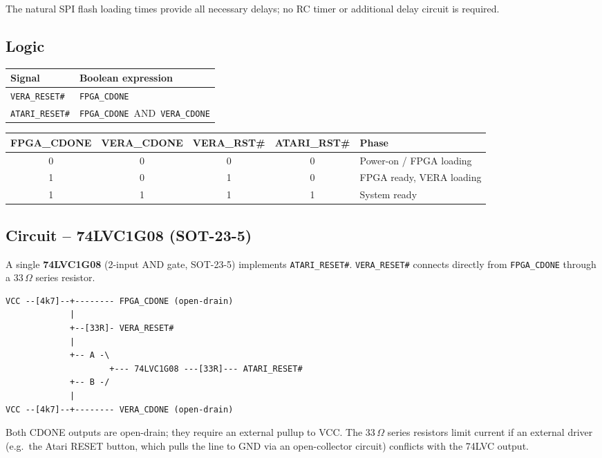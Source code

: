 \documentclass[11pt,a4paper]{article}
\newcommand{\sig}[1]{\texttt{#1}}
\begin{document}
The natural SPI flash loading times provide all necessary delays; no RC
timer or additional delay circuit is required.

\subsection{Logic}

\begin{center}
\begin{tabular}{ll}
\toprule
\textbf{Signal} & \textbf{Boolean expression} \\
\midrule
\sig{VERA\_RESET\#}  & \sig{FPGA\_CDONE} \\
\sig{ATARI\_RESET\#} & \sig{FPGA\_CDONE}~AND~\sig{VERA\_CDONE} \\
\bottomrule
\end{tabular}
\end{center}

\begin{center}
\begin{tabular}{ccccp{3.5cm}}
\toprule
\textbf{FPGA\_CDONE} & \textbf{VERA\_CDONE} &
\textbf{VERA\_RST\#} & \textbf{ATARI\_RST\#} & \textbf{Phase} \\
\midrule
0 & 0 & 0 & 0 & Power-on / FPGA loading \\
1 & 0 & 1 & 0 & FPGA ready, VERA loading \\
1 & 1 & 1 & 1 & System ready \\
\bottomrule
\end{tabular}
\end{center}

\subsection{Circuit -- 74LVC1G08 (SOT-23-5)}

A single \textbf{74LVC1G08} (2-input AND gate, SOT-23-5) implements
\sig{ATARI\_RESET\#}.  \sig{VERA\_RESET\#} connects directly from
\sig{FPGA\_CDONE} through a 33\,$\Omega$ series resistor.

\begin{lstlisting}[style=shell]
VCC --[4k7]--+-------- FPGA_CDONE (open-drain)
             |
             +--[33R]- VERA_RESET#
             |
             +-- A -\
                     +--- 74LVC1G08 ---[33R]--- ATARI_RESET#
             +-- B -/
             |
VCC --[4k7]--+-------- VERA_CDONE (open-drain)
\end{lstlisting}

Both CDONE outputs are open-drain; they require an external pullup to
VCC\@.  The 33\,$\Omega$ series resistors limit current if an external
driver (e.g.\ the Atari RESET button, which pulls the line to GND via
an open-collector circuit) conflicts with the 74LVC output.
\end{document}
